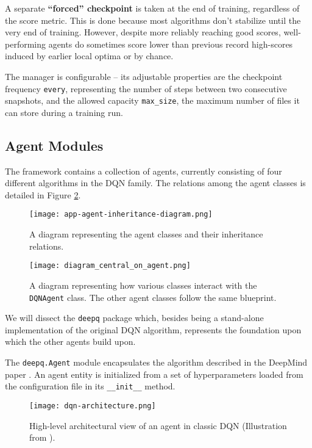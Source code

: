 A separate \textbf{``forced'' checkpoint} is taken at the end of training, regardless of the score metric.
This is done because most algorithms don’t stabilize until the very end of training.
However, despite more reliably reaching good scores, well-performing agents do sometimes score lower than previous record high-scores induced by earlier local optima or by chance.

The manager is configurable -- its adjustable properties are the checkpoint frequency \texttt{every}, 
representing the number of steps between two consecutive snapshots, and the allowed capacity
\verb|max_size|, the maximum number of files it can store during a training run.

\subsection{Agent Modules} \label{section:agent-modules}

The framework contains a collection of agents, currently consisting of four different algorithms in the DQN family.
The relations among the agent classes is detailed in Figure \ref{fig:agent-class-diagram}.

\begin{figure}[h]
    \centering
    \texttt{[image: app-agent-inheritance-diagram.png]}
    \caption{A diagram representing the agent classes and their inheritance relations.}
    \label{fig:agent-class-diagram}
\end{figure}

\begin{figure}[h]
    \centering
    \texttt{[image: diagram\_central\_on\_agent.png]}
    \caption{A diagram representing how various classes interact with the \texttt{DQNAgent} class.
    The other agent classes follow the same blueprint.
    }
    \label{fig:agent-class-diagram}
\end{figure}

We will dissect the \texttt{deepq} package which, besides being a stand-alone implementation of the original DQN algorithm, represents the foundation upon which the other agents build upon.

The \texttt{deepq.Agent} module encapsulates the algorithm described in the DeepMind paper \cite{atari-dqn}.
An agent entity is initialized from a set of hyperparameters loaded from the configuration file in its \verb|__init__| method.

\begin{figure}
    \centering
    \texttt{[image: dqn-architecture.png]}
    \caption{High-level architectural view of an agent in classic DQN (Illustration from \cite{mpmdrl}).}
    \label{fig:dqn-architecture}
\end{figure}

